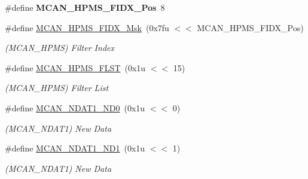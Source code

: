 \begin{DoxyCompactItemize}
\mbox{\label{group__SAMV71__MCAN_gaade58def638f4d1d3b8d122b4377f4ff}} 
\#define {\bfseries M\+C\+A\+N\+\_\+\+H\+P\+M\+S\+\_\+\+F\+I\+D\+X\+\_\+\+Pos}~8
\item 
\mbox{\label{group__SAMV71__MCAN_gac4cda0bf7ea519c36442c211d6b4edcb}} 
\#define \mbox{\hyperlink{group__SAMV71__MCAN_gac4cda0bf7ea519c36442c211d6b4edcb}{M\+C\+A\+N\+\_\+\+H\+P\+M\+S\+\_\+\+F\+I\+D\+X\+\_\+\+Msk}}~(0x7fu $<$$<$ M\+C\+A\+N\+\_\+\+H\+P\+M\+S\+\_\+\+F\+I\+D\+X\+\_\+\+Pos)
\begin{DoxyCompactList}\small\item\em (M\+C\+A\+N\+\_\+\+H\+P\+MS) Filter Index \end{DoxyCompactList}\item 
\mbox{\label{group__SAMV71__MCAN_ga949a7f4be2724a48cbd47a5aba3f0ec2}} 
\#define \mbox{\hyperlink{group__SAMV71__MCAN_ga949a7f4be2724a48cbd47a5aba3f0ec2}{M\+C\+A\+N\+\_\+\+H\+P\+M\+S\+\_\+\+F\+L\+ST}}~(0x1u $<$$<$ 15)
\begin{DoxyCompactList}\small\item\em (M\+C\+A\+N\+\_\+\+H\+P\+MS) Filter List \end{DoxyCompactList}\item 
\mbox{\label{group__SAMV71__MCAN_ga4f46c691b52d8e61734302438436b06a}} 
\#define \mbox{\hyperlink{group__SAMV71__MCAN_ga4f46c691b52d8e61734302438436b06a}{M\+C\+A\+N\+\_\+\+N\+D\+A\+T1\+\_\+\+N\+D0}}~(0x1u $<$$<$ 0)
\begin{DoxyCompactList}\small\item\em (M\+C\+A\+N\+\_\+\+N\+D\+A\+T1) New Data \end{DoxyCompactList}\item 
\mbox{\label{group__SAMV71__MCAN_gaa83c7bb353d636988a68f3f5809e96fa}} 
\#define \mbox{\hyperlink{group__SAMV71__MCAN_gaa83c7bb353d636988a68f3f5809e96fa}{M\+C\+A\+N\+\_\+\+N\+D\+A\+T1\+\_\+\+N\+D1}}~(0x1u $<$$<$ 1)
\begin{DoxyCompactList}\small\item\em (M\+C\+A\+N\+\_\+\+N\+D\+A\+T1) New Data \end{DoxyCompactList}\item 
\mbox{\label{group__SAMV71__MCAN_gaebaa1cee4b534bff06778d4c847e50d3}} 

\end{DoxyCompactItemize}
